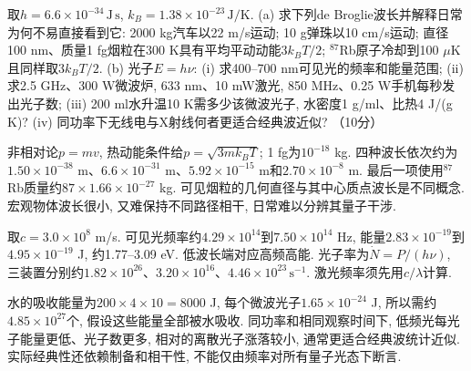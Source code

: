 \begin{exercise}
取$h=6.6\times10^{-34}\,\mathrm{J\,s}$, $k_B=1.38\times10^{-23}\,\mathrm{J/K}$.
(a) 求下列de Broglie波长并解释日常为何不易直接看到它: 2000 kg汽车以22 m/s运动; 10 g弹珠以10 cm/s运动; 直径100 nm、质量1 fg烟粒在300 K具有平均平动动能$3k_BT/2$; $^{87}$Rb原子冷却到100 $\mu$K且同样取$3k_BT/2$.
(b) 光子$E=h\nu$: (i) 求400--700 nm可见光的频率和能量范围; (ii) 求2.5 GHz、300 W微波炉, 633 nm、10 mW激光, 850 MHz、0.25 W手机每秒发出光子数; (iii) 200 ml水升温10 K需多少该微波光子, 水密度1 g/ml、比热4 J/(g K)? (iv) 同功率下无线电与X射线何者更适合经典波近似? （10分）
\end{exercise}
\begin{solution}
非相对论$p=mv$, 热动能条件给$p=\sqrt{3mk_BT}$; 1 fg为$10^{-18}$ kg. 四种波长依次约为$1.50\times10^{-38}$ m、$6.6\times10^{-31}$ m、$5.92\times10^{-15}$ m和$2.70\times10^{-8}$ m. 最后一项使用$^{87}$Rb质量约$87\times1.66\times10^{-27}$ kg. 可见烟粒的几何直径与其中心质点波长是不同概念. 宏观物体波长很小, 又难保持不同路径相干, 日常难以分辨其量子干涉.

取$c=3.0\times10^8$ m/s. 可见光频率约$4.29\times10^{14}$到$7.50\times10^{14}$ Hz, 能量$2.83\times10^{-19}$到$4.95\times10^{-19}$ J, 约1.77--3.09 eV. 低波长端对应高频高能. 光子率为$\dot N=P/(h\nu)$, 三装置分别约$1.82\times10^{26}$、$3.20\times10^{16}$、$4.46\times10^{23}\,\mathrm{s^{-1}}$. 激光频率须先用$c/\lambda$计算.

水的吸收能量为$200\times4\times10=8000$ J, 每个微波光子$1.65\times10^{-24}$ J, 所以需约$4.85\times10^{27}$个, 假设这些能量全部被水吸收. 同功率和相同观察时间下, 低频光每光子能量更低、光子数更多, 相对的离散光子涨落较小, 通常更适合经典波统计近似. 实际经典性还依赖制备和相干性, 不能仅由频率对所有量子光态下断言.
\end{solution}


